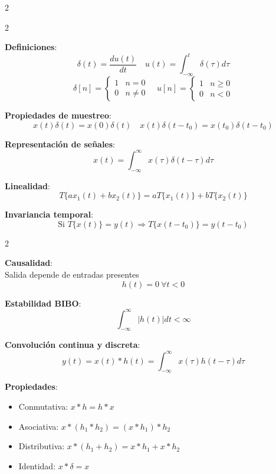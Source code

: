 \documentclass{article}
\begin{document}
\begin{multicols}{2}
\begin{multicols}{2}
\end{multicols}

\begin{itemform}
\item \textbf{Definiciones}:
$$\delta(t) = \frac{du(t)}{dt} \quad u(t) = \int_{-\infty}^t \delta(\tau)d\tau$$
$$\delta[n] = \begin{cases} 1 & n=0 \\ 0 & n\neq 0 \end{cases} \quad u[n] = \begin{cases} 1 & n\geq 0 \\ 0 & n<0 \end{cases}$$
\item \textbf{Propiedades de muestreo}:
$$x(t)\delta(t) = x(0)\delta(t) \quad x(t)\delta(t-t_0) = x(t_0)\delta(t-t_0)$$
\item \textbf{Representación de señales}:
$$x(t) = \int_{-\infty}^{\infty} x(\tau)\delta(t-\tau)d\tau $$
\end{itemform}


\begin{itemform}
\item \textbf{Linealidad}:
$$T\{a x_1(t) + b x_2(t)\} = a T\{x_1(t)\} + b T\{x_2(t)\}$$
\item \textbf{Invariancia temporal}:
$$\text{Si } T\{x(t)\} = y(t) \Rightarrow T\{x(t-t_0)\} = y(t-t_0)$$
\end{itemform}
\begin{multicols}{2}
\begin{itemform}
  \item \textbf{Causalidad}:\\
Salida depende de entradas presentes
$$h(t) = 0 \ \forall t < 0 $$

\columnbreak
\item \textbf{Estabilidad BIBO}:
$$\int_{-\infty}^{\infty} |h(t)|dt < \infty $$
\end{itemform}
\end{multicols}

\begin{itemform}
\item \textbf{Convolución continua y discreta}:
$$y(t) = x(t) * h(t) = \int_{-\infty}^{\infty} x(\tau)h(t-\tau)d\tau$$

\item \textbf{Propiedades}:
\begin{itemize}[leftmargin=*,noitemsep,topsep=0pt]
  \item Conmutativa: $x * h = h * x$
  \item Asociativa: $x * (h_1 * h_2) = (x * h_1) * h_2$
  \item Distributiva: $x * (h_1 + h_2) = x * h_1 + x * h_2$
  \item Identidad: $x * \delta = x$
\end{itemize}
\end{itemform}


\end{multicols}
\end{document}
